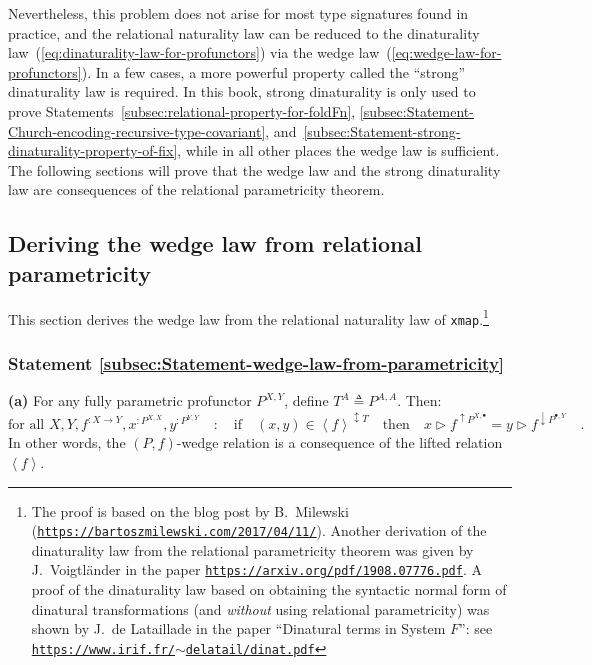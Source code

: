 Nevertheless, this problem does not arise for most type signatures
found in practice, and the relational naturality law can be reduced
to the dinaturality law~(\ref{eq:dinaturality-law-for-profunctors})
via the wedge law~(\ref{eq:wedge-law-for-profunctors}). In a few
cases, a more powerful property called the \textsf{``}strong\textsf{''} dinaturality
law is required. In this book, strong dinaturality is only used to
prove Statements~\ref{subsec:relational-property-for-foldFn}, \ref{subsec:Statement-Church-encoding-recursive-type-covariant},
and~\ref{subsec:Statement-strong-dinaturality-property-of-fix},
while in all other places the wedge law is sufficient. The following
sections will prove that the wedge law and the strong dinaturality
law are consequences of the relational parametricity theorem.

\subsection{Deriving the wedge law from relational parametricity}

This section derives the wedge law from the relational naturality
law of \lstinline!xmap!.\footnote{The proof is based on the blog post by B.~Milewski
(\texttt{\href{https://bartoszmilewski.com/2017/04/11/}{https://bartoszmilewski.com/2017/04/11/}}).
Another derivation of the dinaturality law from the relational parametricity
theorem was given by J.~Voigtl\"ander
in the paper \texttt{\href{https://arxiv.org/pdf/1908.07776.pdf}{https://arxiv.org/pdf/1908.07776.pdf}}.
A proof of the dinaturality law based on obtaining the syntactic normal
form of dinatural transformations (and \emph{without} using relational
parametricity) was shown by J.~de Lataillade
in the paper \textsf{``}Dinatural terms in System $F$\textsf{''}: see \texttt{\href{https://www.irif.fr/~delatail/dinat.pdf}{https://www.irif.fr/$\sim$delatail/dinat.pdf}}}  

\subsubsection{Statement \label{subsec:Statement-wedge-law-from-parametricity}\ref{subsec:Statement-wedge-law-from-parametricity}}

\textbf{(a)} For any fully parametric profunctor $P^{X,Y}$, define
$T^{A}\triangleq P^{A,A}$. Then:
\[
\text{for all }X,Y,f^{:X\rightarrow Y},x^{:P^{X,X}},y^{:P^{Y,Y}}\quad:\quad\text{if}\quad(x,y)\in\left<f\right>^{\updownarrow T}\quad\text{then}\quad x\triangleright f^{\uparrow P^{X,\bullet}}=y\triangleright f^{\downarrow P^{\bullet,Y}}\quad.
\]
In other words, the $\left(P,f\right)$-wedge relation is a consequence
of the lifted relation $\left<f\right>$.


